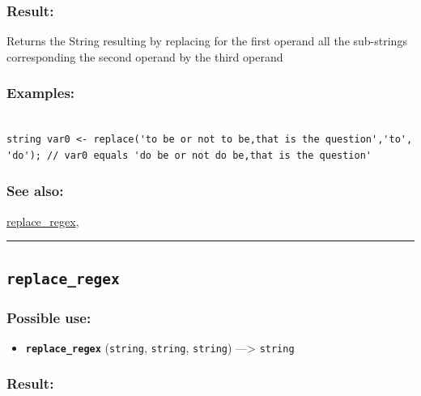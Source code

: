 \documentclass[]{book}
\providecommand{\tightlist}{%
  \setlength{\itemsep}{0pt}\setlength{\parskip}{0pt}}
\theoremstyle{definition}
\theoremstyle{definition}
\theoremstyle{definition}
\theoremstyle{remark}
\begin{document}
\subsubsection{Result:}\label{result-419}

Returns the String resulting by replacing for the first operand all the
sub-strings corresponding the second operand by the third operand

\subsubsection{Examples:}\label{examples-297}

\begin{verbatim}
 
string var0 <- replace('to be or not to be,that is the question','to', 'do'); // var0 equals 'do be or not do be,that is the question'
\end{verbatim}

\subsubsection{See also:}\label{see-also-173}

\href{operators-n-to-r.html\#replace_regex}{replace\_regex},

\begin{center}\rule{0.5\linewidth}{\linethickness}\end{center}

\subsection{\texorpdfstring{\texttt{replace\_regex}}{replace\_regex}}\label{replace_regex}

\subsubsection{Possible use:}\label{possible-use-434}

\begin{itemize}
\tightlist
\item
  \textbf{\texttt{replace\_regex}} (\texttt{string}, \texttt{string},
  \texttt{string}) ---\textgreater{} \texttt{string}
\end{itemize}

\subsubsection{Result:}\label{result-420}
\end{document}
